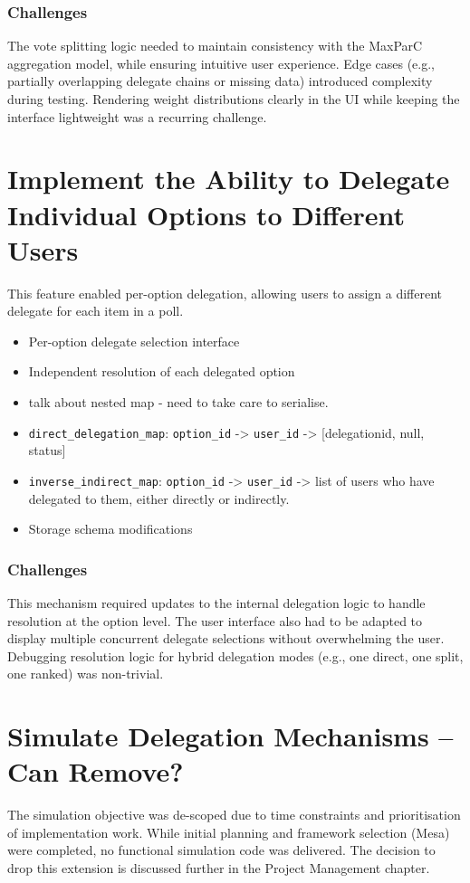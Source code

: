 \subsubsection{Challenges}
The vote splitting logic needed to maintain consistency with the MaxParC aggregation model, while ensuring intuitive user experience. Edge cases (e.g., partially overlapping delegate chains or missing data) introduced complexity during testing. Rendering weight distributions clearly in the UI while keeping the interface lightweight was a recurring challenge.

\section{Implement the Ability to Delegate Individual Options to Different Users}
This feature enabled per-option delegation, allowing users to assign a different delegate for each item in a poll.

\begin{itemize}
  \item Per-option delegate selection interface
  \item Independent resolution of each delegated option
  \item talk about nested map - need to take care to serialise.
  \item \verb|direct_delegation_map|: \verb|option_id| -> \verb|user_id| -> [delegationid, null, status]
  \item \verb|inverse_indirect_map|: \verb|option_id| -> \verb|user_id| -> list of users who have delegated to them, either directly or indirectly.
  \item Storage schema modifications
\end{itemize}

\subsubsection{Challenges}
This mechanism required updates to the internal delegation logic to handle resolution at the option level. The user interface also had to be adapted to display multiple concurrent delegate selections without overwhelming the user. Debugging resolution logic for hybrid delegation modes (e.g., one direct, one split, one ranked) was non-trivial.

\section{Simulate Delegation Mechanisms -- Can Remove?}
The simulation objective was de-scoped due to time constraints and prioritisation of implementation work. While initial planning and framework selection (Mesa) were completed, no functional simulation code was delivered. The decision to drop this extension is discussed further in the Project Management chapter.

